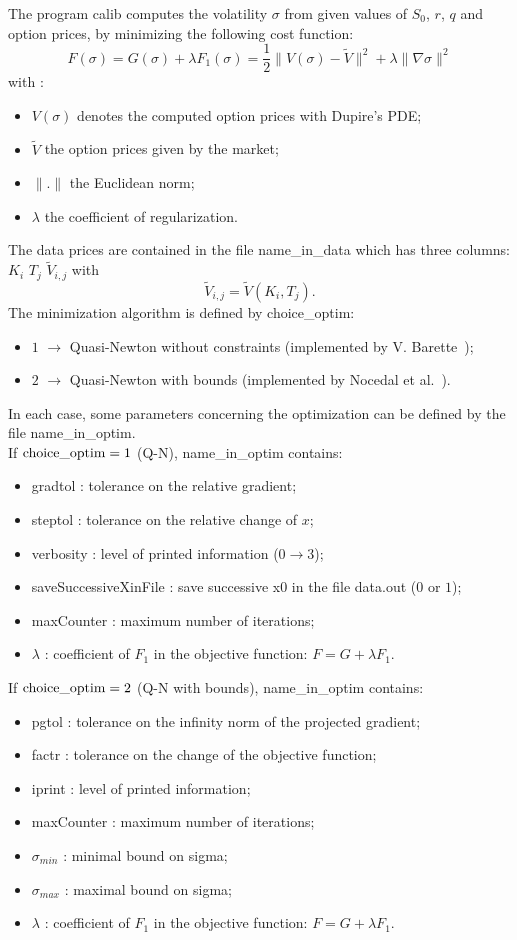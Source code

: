 \documentclass[12pt]{article}
\begin{document}
The program calib computes the volatility $\sigma$ from given values of 
$S_0$, $r$, $q$ and option prices, by minimizing the following cost 
function: 
$$
F(\sigma) = G(\sigma) + \lambda F_1(\sigma) 
= \frac{1}{2} \| V(\sigma) - \tilde{V} \|^2 + 
\lambda \| \nabla \sigma \|^2
$$
with : 
\begin{itemize}
\item
$V(\sigma)$ denotes the computed option prices with Dupire's PDE;
\item
$\tilde{V}$ the option prices given by the market;
\item
$\|.\|$ the Euclidean norm;
\item
$\lambda$ the coefficient of regularization.
\end{itemize}
The data prices are contained in the file name\_in\_data which has three 
columns: $K_i$ $T_j$ $\tilde{V}_{i,j}$ with 
$$
\tilde{V}_{i,j} = \tilde{V}(K_i,T_j).
$$
The minimization algorithm is defined by choice\_optim:
\begin{itemize}
\item
$1$ $\rightarrow$ Quasi-Newton without constraints (implemented by 
V. Barette~\cite{bar:optim:02});
\item
$2$ $\rightarrow$ Quasi-Newton with bounds (implemented by Nocedal 
et al.~\cite{noce:siam:95,noce:acm:97}).
\end{itemize}
In each case, some parameters concerning the optimization can be 
defined by the file name\_in\_optim.\\
If ${\rm choice\_optim} = 1$ (Q-N), name\_in\_optim contains:
\begin{itemize}
\item 
gradtol : tolerance on the relative gradient;
\item 
steptol : tolerance on the relative change of $x$;
\item 
verbosity : level of printed information ($0 \rightarrow 3$);
\item 
saveSuccessiveXinFile : save successive x0 in the file data.out 
($0$ or $1$);
\item 
maxCounter : maximum number of iterations;
\item 
$\lambda$ : coefficient of $F_1$ in the objective function: 
$F = G + \lambda F_1$.
\end{itemize}
If ${\rm choice\_optim} = 2$ (Q-N with bounds), name\_in\_optim 
contains:
\begin{itemize}
\item 
pgtol : tolerance on the infinity norm of the projected gradient;
\item 
factr : tolerance on the change of the objective function;
\item 
iprint : level of printed information;
\item 
maxCounter : maximum number of iterations;
\item 
$\sigma_{min}$ : minimal bound on sigma;
\item 
$\sigma_{max}$ : maximal bound on sigma;
\item
$\lambda$ : coefficient of $F_1$ in the objective function: 
$F = G + \lambda F_1$.
\end{itemize}
\end{document}
